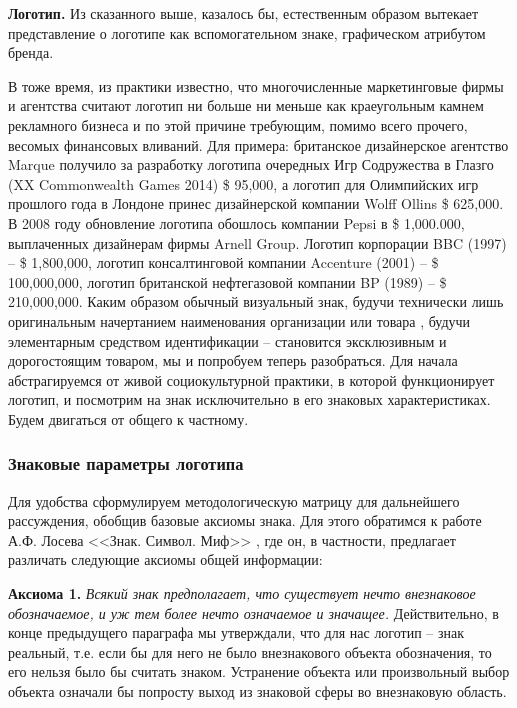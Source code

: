 \textbf{Логотип.} Из сказанного выше, казалось бы, естественным образом вытекает
  представление о логотипе как вспомогательном знаке, графическом атрибутом бренда.


В тоже время, из практики известно, что многочисленные маркетинговые фирмы и
агентства считают логотип  ни больше ни меньше как краеугольным камнем рекламного
бизнеса и по этой причине требующим, помимо всего прочего, весомых финансовых
вливаний. Для примера: британское дизайнерское агентство Marque получило за
разработку логотипа очередных Игр Содружества в Глазго
(XX Commonwealth Games 2014)  \$ 95,000, а логотип для Олимпийских игр прошлого
года в Лондоне принес дизайнерской компании Wolff Ollins  \$ 625,000.
В 2008 году обновление логотипа обошлось компании Pepsi в \$ 1,000.000,
выплаченных дизайнерам фирмы Arnell Group. Логотип корпорации BBC (1997) --
\$ 1,800,000,  логотип консалтинговой компании Accenture (2001) -- \$ 100,000,000,
логотип британской нефтегазовой компании BP (1989) – \$ 210,000,000\autocite{logotipy}.
Каким образом обычный визуальный знак, будучи технически лишь оригинальным
начертанием наименования организации или товара \autocite[][65]{rogers2001marketing},
будучи элементарным средством идентификации -- становится эксклюзивным и
дорогостоящим товаром, мы и попробуем теперь разобраться. Для начала
абстрагируемся от живой социокультурной практики, в которой функционирует
логотип, и посмотрим на знак исключительно в его знаковых характеристиках.
Будем двигаться от общего к частному.

\subsubsection{Знаковые параметры логотипа}
Для удобства сформулируем методологическую матрицу для дальнейшего
рассуждения, обобщив базовые аксиомы знака. Для этого обратимся к
работе А.Ф. Лосева <<Знак. Символ. Миф>> \autocite[][32-42]{losev1982}, где он, в частности,
предлагает различать следующие аксиомы общей информации:

\textbf{Аксиома 1.} \emph{Всякий знак предполагает, что существует нечто внезнаковое
    обозначаемое, и уж тем более нечто означаемое и значащее.} Действительно,
  в конце предыдущего параграфа мы утверждали, что для нас логотип -- знак
  реальный, т.е. если бы для него не было внезнакового объекта обозначения,
  то его нельзя было бы считать знаком. Устранение объекта или произвольный
  выбор объекта означали бы попросту выход из знаковой сферы во внезнаковую
  область.

